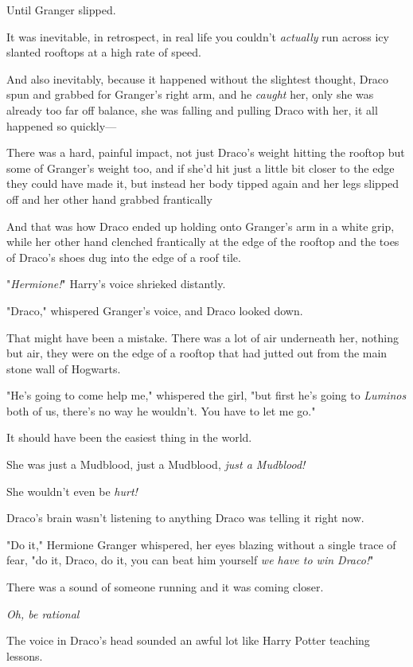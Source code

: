 Until Granger slipped.

It was inevitable, in retrospect, in real life you couldn't \emph{actually} run
across icy slanted rooftops at a high rate of speed.

And also inevitably, because it happened without the slightest thought, Draco
spun and grabbed for Granger's right arm, and he \emph{caught} her, only she
was already too far off balance, she was falling and pulling Draco with her, it
all happened so quickly—

There was a hard, painful impact, not just Draco's weight hitting the rooftop
but some of Granger's weight too, and if she'd hit just a little bit closer to
the edge they could have made it, but instead her body tipped again and her
legs slipped off and her other hand grabbed frantically{\el}

And that was how Draco ended up holding onto Granger's arm in a white grip,
while her other hand clenched frantically at the edge of the rooftop and the
toes of Draco's shoes dug into the edge of a roof tile.

"\emph{Hermione!}" Harry's voice shrieked distantly.

"Draco," whispered Granger's voice, and Draco looked down.

That might have been a mistake. There was a lot of air underneath her, nothing
but air, they were on the edge of a rooftop that had jutted out from the main
stone wall of Hogwarts.

"He's going to come help me," whispered the girl, "but first he's going to
\emph{Luminos} both of us, there's no way he wouldn't. You have to let me go."

It should have been the easiest thing in the world.

She was just a Mudblood, just a Mudblood, \emph{just a Mudblood!}

She wouldn't even be \emph{hurt!}

{\el} Draco's brain wasn't listening to anything Draco was telling it right
now.

"Do it," Hermione Granger whispered, her eyes blazing without a single trace of
fear, "do it, Draco, do it, you can beat him yourself \emph{we have to win
Draco!}"

There was a sound of someone running and it was coming closer.

\emph{Oh, be rational{\el}}

The voice in Draco's head sounded an awful lot like Harry Potter teaching
lessons.

